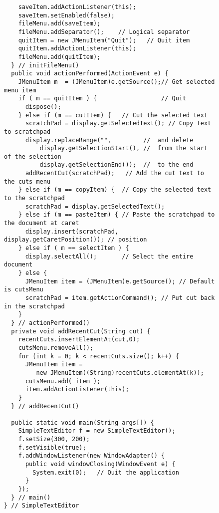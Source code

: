 \clearpage
\begin{figure}[h!]
\addtocounter{figure}{-1}
\jjjprogstart
\begin{jjjlisting}[37pc]
\begin{lstlisting}
    saveItem.addActionListener(this);
    saveItem.setEnabled(false);
    fileMenu.add(saveItem);
    fileMenu.addSeparator();    // Logical separator
    quitItem = new JMenuItem("Quit");   // Quit item
    quitItem.addActionListener(this);
    fileMenu.add(quitItem);
  } // initFileMenu()
  public void actionPerformed(ActionEvent e) {
    JMenuItem m  = (JMenuItem)e.getSource();// Get selected menu item
    if ( m == quitItem ) {                  // Quit
      dispose();
    } else if (m == cutItem) {   // Cut the selected text
      scratchPad = display.getSelectedText(); // Copy text to scratchpad
      display.replaceRange("",         //  and delete
          display.getSelectionStart(), //  from the start of the selection
          display.getSelectionEnd());  //  to the end
      addRecentCut(scratchPad);   // Add the cut text to the cuts menu
    } else if (m == copyItem) {  // Copy the selected text to the scratchpad
      scratchPad = display.getSelectedText();
    } else if (m == pasteItem) { // Paste the scratchpad to the document at caret
      display.insert(scratchPad, display.getCaretPosition()); // position
    } else if ( m == selectItem ) {
      display.selectAll();       // Select the entire document
    } else {
      JMenuItem item = (JMenuItem)e.getSource(); // Default is cutsMenu
      scratchPad = item.getActionCommand(); // Put cut back in the scratchpad
    }
  } // actionPerformed()
  private void addRecentCut(String cut) {
    recentCuts.insertElementAt(cut,0);
    cutsMenu.removeAll();
    for (int k = 0; k < recentCuts.size(); k++) {
      JMenuItem item = 
         new JMenuItem((String)recentCuts.elementAt(k));
      cutsMenu.add( item );
      item.addActionListener(this);
    }
  } // addRecentCut()

  public static void main(String args[]) {
    SimpleTextEditor f = new SimpleTextEditor();
    f.setSize(300, 200);
    f.setVisible(true);
    f.addWindowListener(new WindowAdapter() {     
      public void windowClosing(WindowEvent e) {
        System.exit(0);   // Quit the application
      }
    });
  } // main()
} // SimpleTextEditor
\end{lstlisting}
\end{jjjlisting}
\end{figure}

